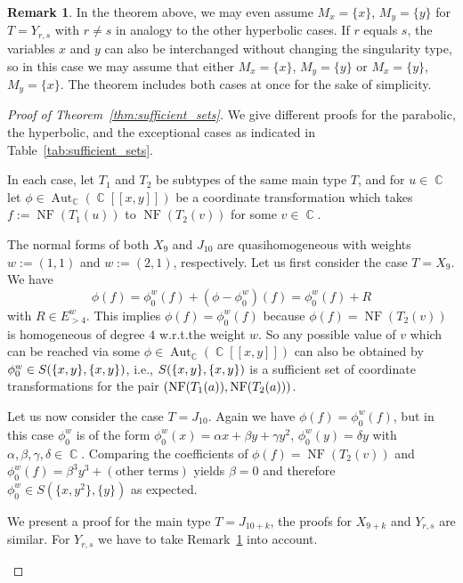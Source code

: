 \documentclass[noend]{amsproc}
\theoremstyle{definition}
\newtheorem{remark}[theorem]{Remark}
\let\originalleft\left
\let\originalright\right
\renewcommand{\left}{\mathopen{}\mathclose\bgroup\originalleft}
\renewcommand{\right}{\aftergroup\egroup\originalright}
\DeclareMathOperator{\C}{\mathbb{C}}
\DeclareMathOperator{\NF}{NF}
\DeclareMathOperator{\Aut}{Aut}
\begin{document}
\begin{remark}\label{rem:sufficient_sets_Yrs}
In the theorem above, we may even assume $M_x = \{x\}$, $M_y = \{y\}$ for
$T = Y_{r,s}$ with $r \neq s$ in analogy to the other hyperbolic cases. If $r$
equals $s$, the variables $x$ and $y$ can also be interchanged without changing
the singularity type, so in this case we may assume that either $M_x = \{x\}$,
$M_y = \{y\}$ or $M_x = \{y\}$, $M_y = \{x\}$. The theorem includes both cases
at once for the sake of simplicity.
\end{remark}

\begin{proof}[Proof of Theorem~\ref{thm:sufficient_sets}]
We give different proofs for the parabolic, the hyperbolic, and the exceptional
cases as indicated in Table~\ref{tab:sufficient_sets}.

In each case, let $T_1$ and $T_2$ be subtypes of the same main type $T$, and
for $u \in \C$ let $\phi \in \Aut_{\C}(\C[[x,y]])$ be a coordinate
transformation which takes $f := \NF(T_1(u))$ to $\NF(T_2(v))$ for some
$v \in \C$.

\begin{description}[font=\normalfont\itshape,%
leftmargin=0cm,labelindent=\parindent]

\item[Parabolic cases]
The normal forms of both $X_9$ and $J_{10}$ are
quasihomogeneous with weights $w := (1,1)$ and $w := (2,1)$, respectively. Let
us first consider the case $T = X_9$. We have
\[
\phi(f) = \phi_0^w(f)+(\phi-\phi_0^w)(f) = \phi_0^w(f)+R
\]
with $R \in E_{>4}^w$. This implies $\phi(f) = \phi_0^w(f)$ because
$\phi(f) = \NF(T_2(v))$ is homogeneous of degree $4$ w.r.t.\@ the weight $w$.
So any possible value of $v$ which can be reached via some
$\phi \in \Aut_{\C}(\C[[x,y]])$ can also be obtained by
$\phi_0^w \in S\left(\{x,y\}, \{x,y\}\right)$, i.e.\@,
$S\left(\{x,y\}, \{x,y\}\right)$ is a sufficient set of coordinate
transformations for the pair $\left(\NF(T_1(a)), \NF(T_2(a))\right)$.

Let us now consider the case $T = J_{10}$.
Again we have $\phi(f) = \phi_0^w(f)$, but
in this case
$\phi_0^w$ is of the form
$\phi_0^w(x) = \alpha x + \beta y + \gamma y^2$,
$\phi_0^w(y) = \delta y$ with
$\alpha, \beta, \gamma, \delta \in \C$. Comparing the coefficients of
$\phi(f) = \NF(T_2(v))$ and
$\phi_0^w(f) = \beta^3 y^3 + (\text{other terms})$ yields
$\beta = 0$ and therefore $\phi_0^w \in S(\{x, y^2\}, \{y\})$
as expected.

\item[Hyperbolic cases]
We present a proof for the main type $T = J_{10+k}$, the proofs for $X_{9+k}$
and $Y_{r,s}$ are similar. For $Y_{r,s}$ we have to take
Remark~\ref{rem:sufficient_sets_Yrs} into account.


\end{description}
\end{proof}
\end{document}
